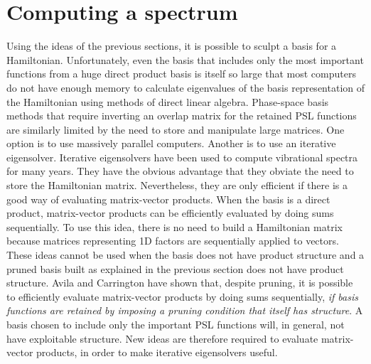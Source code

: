 \section{Computing a spectrum\label{sec.compit}}



Using the ideas of the previous sections, it is possible to sculpt a basis for a Hamiltonian.   Unfortunately, even the basis that includes only
the most important functions from a huge direct product basis is itself so large that most computers do not have enough memory to calculate eigenvalues of the 
basis representation of the Hamiltonian using methods of direct linear algebra.
Phase-space basis methods that require inverting an overlap matrix for the retained PSL functions are similarly limited by the need to store and manipulate large matrices.  \cite{Shimshovitz2014,Machnes2016} 
   One option is to use massively parallel computers.   \cite{Halverson2012,Halverson2014}    Another is 
to use an  iterative eigensolver.    
  Iterative eigensolvers  have been used to compute vibrational spectra for many years. \cite{Light2000,Bowman2008,Huang1999,Roy1995,Bramley1993,Mandelshtam1997,Iung1989,Yu1997,Chen1998} 
%
   They have the obvious advantage that they obviate the need
to store the Hamiltonian matrix.   Nevertheless, they are only efficient if there is a good way of evaluating matrix-vector products.    When the basis is a direct product,
 matrix-vector products can be efficiently evaluated by doing sums sequentially.\cite{Light2000,Bramley1993}   
%
  To use this idea, there is no need to build a Hamiltonian matrix because 
matrices representing 1D factors are sequentially  applied        to vectors.   These ideas cannot be used when the basis does not have product structure and a pruned basis 
built as explained in the previous section does not have product structure.    Avila and Carrington have shown that, despite pruning, it is possible to efficiently 
evaluate matrix-vector products by doing sums sequentially, {\it{ if basis functions are retained by imposing a pruning condition that itself has structure}}.\cite{Avila2009,Avila2011,Avila2015}
%
 A basis 
chosen to include only the important PSL functions will, in general, not have exploitable structure.    New ideas  are therefore required to evaluate matrix-vector products, in order to make iterative eigensolvers useful.


